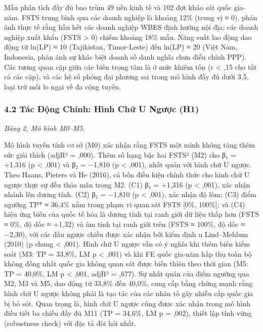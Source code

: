 \documentclass[12pt,a4paper]{article}
\begin{document}
Mẫu phân tích đầy đủ bao trùm 49 nền kinh tế và 102 đợt khảo sát quốc
gia-năm. FSTS trung bình qua các doanh nghiệp là khoảng 12\% (trung vị ≈
0), phản ánh thực tế rằng hầu hết các doanh nghiệp WBES định hướng nội
địa; các doanh nghiệp xuất khẩu (FSTS \textgreater{} 0) chiếm khoảng
18\% mẫu. Năng suất lao động dao động từ ln(LP) ≈ 10 (Tajikistan,
Timor-Leste) đến ln(LP) ≈ 20 (Việt Nam, Indonesia, phản ánh sự khác biệt
doanh số danh nghĩa chưa điều chỉnh PPP). Các tương quan cặp giữa các
biến trọng tâm là ở mức khiêm tốn (\textbar r\textbar{} \textless{} ,15
cho tất cả các cặp), và các hệ số phóng đại phương sai trong mô hình đầy
đủ dưới 3,5, loại trừ mối lo ngại về đa cộng tuyến.

\hypertarget{42-tuxe1c-ux111ux1ed9ng-chuxednh-huxecnh-chux1eef-u-ngux1b0ux1ee3c-h1}{%
\subsubsection{4.2 Tác Động Chính: Hình Chữ U Ngược
(H1)}\label{42-tuxe1c-ux111ux1ed9ng-chuxednh-huxecnh-chux1eef-u-ngux1b0ux1ee3c-h1}}

\emph{Bảng 2, Mô hình M0--M5.}

Mô hình tuyến tính cơ sở (M0) xác nhận rằng FSTS một mình không tăng
thêm sức giải thích (adjR² = ,000). Thêm số hạng bậc hai FSTS² (M2) cho
β₁ = +1,316 (p \textless{} ,001) và β₂ = −1,810 (p \textless{} ,001),
nhất quán với hình chữ U ngược. Theo Haans, Pieters và He (2016), cả bốn
điều kiện chính thức cho hình chữ U ngược thực sự đều thỏa mãn trong M2.
(C1) β₁ = +1,316 (p \textless{} ,001), xác nhận nhánh lên dương tính.
(C2) β₂ = −1,810 (p \textless{} ,001), xác nhận độ lõm; (C3) điểm ngưỡng
TP* ≈ 36,4\% nằm trong phạm vi quan sát FSTS {[}0\%, 100\%{]}; và (C4)
hiệu ứng biên của quốc tế hóa là dương tính tại ranh giới dữ liệu thấp
hơn (FSTS ≈ 0\%, độ dốc ≈ +1,32) và âm tính tại ranh giới trên (FSTS ≈
100\%, độ dốc ≈ −2,30), với các dấu ngược chiều được xác nhận bởi kiểm
định u Lind--Mehlum (2010) (p chung \textless{} ,001). Hình chữ U ngược
vẫn có ý nghĩa khi thêm biến kiểm soát (M3: TP = 33,8\%, LM p
\textless{} ,001) và khi FE quốc gia-năm hấp thụ toàn bộ không đồng nhất
quốc gia không quan sát được biến thiên theo thời gian (M5: TP = 40,0\%,
LM p \textless{} ,001, adjR² = ,677). Sự nhất quán của điểm ngưỡng qua
M2, M3 và M5, dao động từ 33,8\% đến 40,0\%, cung cấp bằng chứng mạnh
rằng hình chữ U ngược không phải là tạo tác của các nhân tố gây nhiễu
cấp quốc gia bị bỏ sót. Quan trọng là, hình chữ U ngược cũng được xác
nhận trong mô hình điều tiết ba chiều đầy đủ M11 (TP = 34,6\%, LM p =
,002), thiết lập tính vững (robustness check) với đặc tả đòi hỏi nhất.
\end{document}

